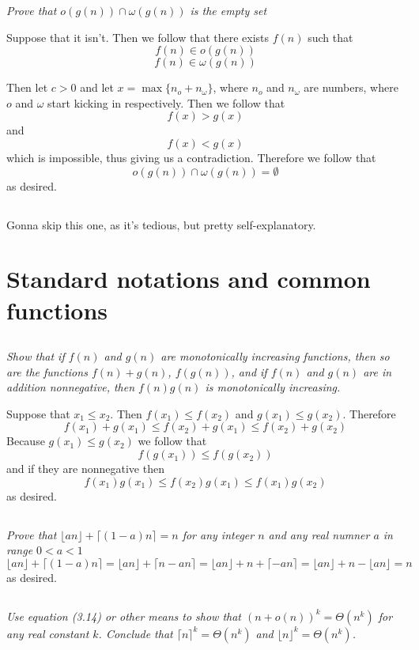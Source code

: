 \documentclass[11pt,oneside,titlepage]{book}
\begin{document}
\textit{Prove that $o(g(n)) \cap \omega(g(n))$ is the empty set}

Suppose that it isn't. Then we follow that there exists $f(n)$ such that
$$f(n) \in o(g(n))$$
$$f(n) \in \omega(g(n))$$

Then let $c > 0$ and let $x = \max\{n_o + n_\omega\}$, where $n_o$ and $n_\omega$ are numbers,
where $o$ and $\omega$ start kicking in respectively. Then we follow that
$$f(x) > g(x)$$
and
$$f(x) < g(x)$$
which is impossible, thus giving us a contradiction. Therefore we follow that
$$o(g(n)) \cap \omega(g(n)) = \emptyset$$
as desired.

\subsection{}

Gonna skip this one, as it's tedious, but pretty self-explanatory.


\section{Standard notations and common functions}

\subsection{}

\textit{Show that if $f(n)$ and $g(n)$ are monotonically increasing functions, then so are
  the functions $f(n) + g(n)$, $f(g(n))$, and if $f(n)$ and $g(n)$ are in addition nonnegative,
  then $f(n) g(n)$ is monotonically increasing.
}

Suppose that $x_1 \leq x_2$. Then $f(x_1) \leq f(x_2)$ and $g(x_1) \leq g(x_2)$. Therefore
$$f(x_1) + g(x_1) \leq f(x_2) + g(x_1) \leq f(x_2) + g(x_2)$$
Because $g(x_1) \leq g(x_2)$ we follow that
$$f(g(x_1)) \leq f(g(x_2))$$
and if they are nonnegative then
$$f(x_1) g(x_1) \leq f(x_2) g(x_1) \leq f(x_1) g(x_2)$$
as desired.

\subsection{}
\textit{Prove that $\lfloor an \rfloor + \lceil (1 - a)n \rceil = n$ for any integer $n$ and
  any real numner $a$ in range $0 < a < 1$}
$$\lfloor an \rfloor + \lceil (1 - a)n \rceil =
\lfloor an \rfloor + \lceil n - an \rceil =
\lfloor an \rfloor + n +  \lceil -   an \rceil =
\lfloor an \rfloor + n -  \lfloor an \rfloor = n 
$$
as desired.

\subsection{}

\textit{Use equation (3.14) or other means to show that $(n + o(n))^k = \Theta(n^k)$ for
  any real constant $k$. Conclude that $\lceil n \rceil^k = \Theta(n^k)$ and
  $\lfloor n \rfloor^k = \Theta(n^k)$.}
\end{document}

